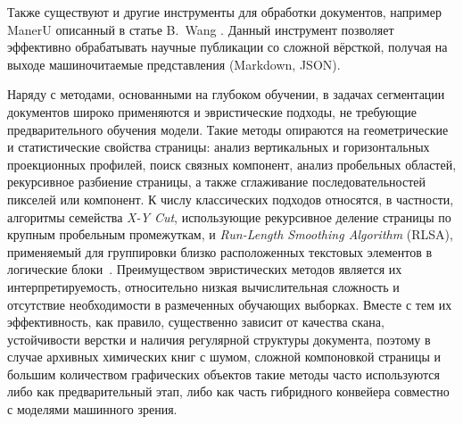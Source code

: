Также существуют и другие инструменты для обработки документов, например ManerU описанный в статье B.~Wang \cite{refMinerU}. Данный инструмент позволяет эффективно обрабатывать научные публикации со сложной вёрсткой, получая на выходе машиночитаемые представления (Markdown, JSON).

Наряду с методами, основанными на глубоком обучении, в задачах сегментации документов широко применяются и эвристические подходы, не требующие предварительного обучения модели. Такие методы опираются на геометрические и статистические свойства страницы: анализ вертикальных и горизонтальных проекционных профилей, поиск связных компонент, анализ пробельных областей, рекурсивное разбиение страницы, а также сглаживание последовательностей пикселей или компонент. К числу классических подходов относятся, в частности, алгоритмы семейства \textit{X-Y Cut}, использующие рекурсивное деление страницы по крупным пробельным промежуткам, и \textit{Run-Length Smoothing Algorithm} (RLSA), применяемый для группировки близко расположенных текстовых элементов в логические блоки~\cite{refXYCut,refRLSA}. Преимуществом эвристических методов является их интерпретируемость, относительно низкая вычислительная сложность и отсутствие необходимости в размеченных обучающих выборках. Вместе с тем их эффективность, как правило, существенно зависит от качества скана, устойчивости верстки и наличия регулярной структуры документа, поэтому в случае архивных химических книг с шумом, сложной компоновкой страницы и большим количеством графических объектов такие методы часто используются либо как предварительный этап, либо как часть гибридного конвейера совместно с моделями машинного зрения.